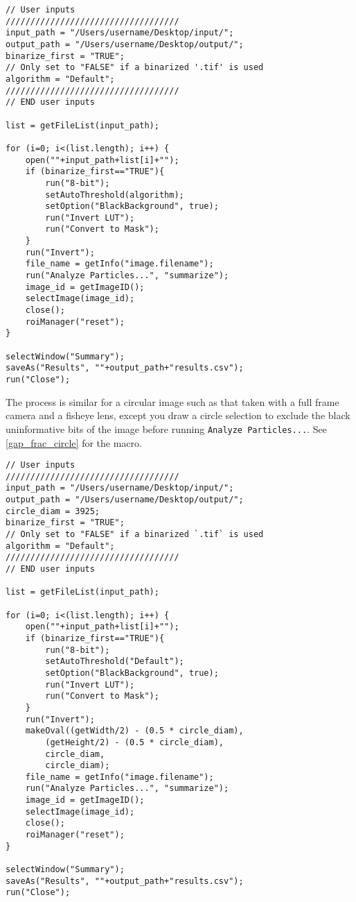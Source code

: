 \documentclass{article}
\newcommand\menu[1]{\texttt{\color{blue}#1}}
\newcommand\file[1]{\texttt{\underline{#1}}}
\begin{document}
\begin{minipage}{\linewidth}
\begin{lstlisting}[label=gap_frac_image, caption=ImageJ macro to calculate the gap fraction of a full image. The macro can also be found in \file{gap\_frac\_image.ijm}.]
// User inputs
///////////////////////////////////
input_path = "/Users/username/Desktop/input/";
output_path = "/Users/username/Desktop/output/";
binarize_first = "TRUE";
// Only set to "FALSE" if a binarized '.tif' is used
algorithm = "Default";
///////////////////////////////////
// END user inputs

list = getFileList(input_path);

for (i=0; i<(list.length); i++) {
	open(""+input_path+list[i]+"");
	if (binarize_first=="TRUE"){
		run("8-bit");
		setAutoThreshold(algorithm);
		setOption("BlackBackground", true);
		run("Invert LUT");
		run("Convert to Mask");
	}
	run("Invert");
	file_name = getInfo("image.filename");
	run("Analyze Particles...", "summarize");
	image_id = getImageID();
	selectImage(image_id);
	close();
	roiManager("reset");
}

selectWindow("Summary"); 
saveAs("Results", ""+output_path+"results.csv"); 
run("Close");
\end{lstlisting}
\end{minipage}

The process is similar for a circular image such as that taken with a full frame camera and a fisheye lens, except you draw a circle selection to exclude the black uninformative bits of the image before running \menu{Analyze Particles...}. See \autoref{gap_frac_circle} for the macro. 

\begin{minipage}{\linewidth}
\begin{lstlisting}[label=gap_frac_circle, caption=ImageJ macro to calculate the gap fraction of a circular selection of an image. The macro can also be found in \file{gap\_frac\_circle.ijm}.]
// User inputs
///////////////////////////////////
input_path = "/Users/username/Desktop/input/";
output_path = "/Users/username/Desktop/output/";
circle_diam = 3925;
binarize_first = "TRUE";
// Only set to "FALSE" if a binarized `.tif` is used
algorithm = "Default";
///////////////////////////////////
// END user inputs

list = getFileList(input_path);

for (i=0; i<(list.length); i++) {
	open(""+input_path+list[i]+"");
	if (binarize_first=="TRUE"){
		run("8-bit");
		setAutoThreshold("Default");
		setOption("BlackBackground", true);
		run("Invert LUT");
		run("Convert to Mask");
	}
	run("Invert");
	makeOval((getWidth/2) - (0.5 * circle_diam),
		(getHeight/2) - (0.5 * circle_diam),
		circle_diam,
		circle_diam);
	file_name = getInfo("image.filename");
	run("Analyze Particles...", "summarize");
	image_id = getImageID();
	selectImage(image_id);
	close();
	roiManager("reset");
}

selectWindow("Summary"); 
saveAs("Results", ""+output_path+"results.csv"); 
run("Close");
\end{lstlisting}
\end{minipage}
\end{document}
